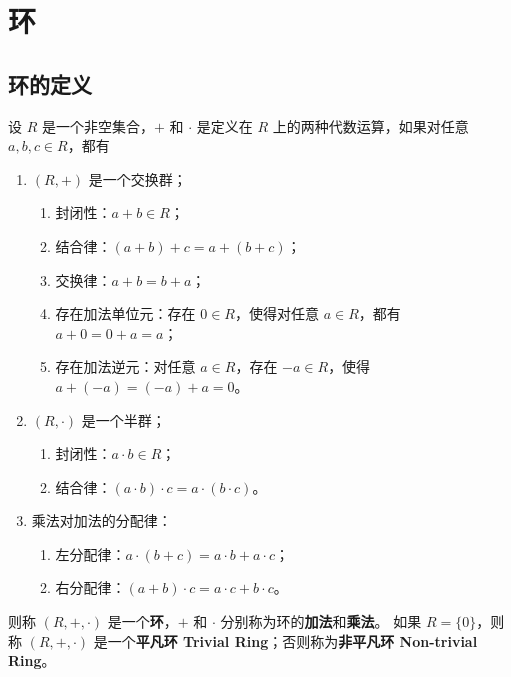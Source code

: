 \section{环}

\subsection{环的定义}
\begin{definition}[环 Ring]
    设 $R$ 是一个非空集合，$+$ 和 $\cdot$ 是定义在 $R$ 上的两种代数运算，如果对任意 $a,b,c \in R$，都有
    \begin{enumerate}
        \item $(R,+)$ 是一个交换群；
            \begin{enumerate}
                \item 封闭性：$a+b \in R$；
                \item 结合律：$(a+b)+c=a+(b+c)$；
                \item 交换律：$a+b=b+a$；
                \item 存在加法单位元：存在 $0 \in R$，使得对任意 $a \in R$，都有 $a+0=0+a=a$；
                \item 存在加法逆元：对任意 $a \in R$，存在 $-a \in R$，使得 $a+(-a)=(-a)+a=0$。
            \end{enumerate}
        \item $(R,\cdot)$ 是一个半群；
            \begin{enumerate}
                \item 封闭性：$a \cdot b \in R$；
                \item 结合律：$(a \cdot b) \cdot c=a \cdot (b \cdot c)$。
            \end{enumerate}
        \item 乘法对加法的分配律：
            \begin{enumerate}
                \item 左分配律：$a \cdot (b+c)=a \cdot b + a \cdot c$；
                \item 右分配律：$(a+b) \cdot c=a \cdot c + b \cdot c$。
            \end{enumerate}
    \end{enumerate}
    则称 $(R,+,\cdot)$ 是一个\textbf{环}，$+$ 和 $\cdot$ 分别称为环的\textbf{加法}和\textbf{乘法}。
    如果 $R=\{0\}$，则称 $(R,+,\cdot)$ 是一个\textbf{平凡环 Trivial Ring}；否则称为\textbf{非平凡环 Non-trivial Ring}。
    \label{def:ring}
\end{definition}


